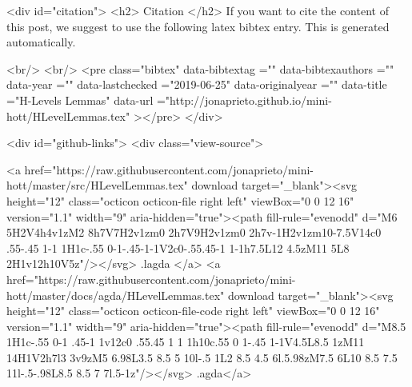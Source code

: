   
  <div id="citation">
  <h2> Citation </h2>
  If you want to cite the content of this post,
  we suggest to use the following latex bibtex entry.
  This is generated automatically.

  <br/>
  <br/>
  <pre class="bibtex"
       data-bibtextag =""
       data-bibtexauthors =""
       data-year =""
       data-lastchecked ="2019-06-25"
       data-originalyear =""
       data-title ="H-Levels Lemmas"
       data-url ="http://jonaprieto.github.io/mini-hott/HLevelLemmas.tex"
  ></pre>
  </div>
  

  <div id="github-links">
    <div class="view-source">
      
        <a href="https://raw.githubusercontent.com/jonaprieto/mini-hott/master/src/HLevelLemmas.tex" download target="_blank"><svg height="12" class="octicon octicon-file right left" viewBox="0 0 12 16" version="1.1" width="9" aria-hidden="true"><path fill-rule="evenodd" d="M6 5H2V4h4v1zM2 8h7V7H2v1zm0 2h7V9H2v1zm0 2h7v-1H2v1zm10-7.5V14c0 .55-.45 1-1 1H1c-.55 0-1-.45-1-1V2c0-.55.45-1 1-1h7.5L12 4.5zM11 5L8 2H1v12h10V5z"/></svg> .lagda </a>
        <a href="https://raw.githubusercontent.com/jonaprieto/mini-hott/master/docs/agda/HLevelLemmas.tex" download target="_blank"><svg height="12" class="octicon octicon-file-code right left" viewBox="0 0 12 16" version="1.1" width="9" aria-hidden="true"><path fill-rule="evenodd" d="M8.5 1H1c-.55 0-1 .45-1 1v12c0 .55.45 1 1 1h10c.55 0 1-.45 1-1V4.5L8.5 1zM11 14H1V2h7l3 3v9zM5 6.98L3.5 8.5 5 10l-.5 1L2 8.5 4.5 6l.5.98zM7.5 6L10 8.5 7.5 11l-.5-.98L8.5 8.5 7 7l.5-1z"/></svg> .agda</a>
      
